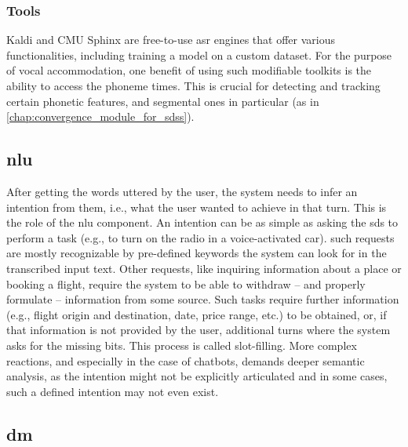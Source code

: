 \subsubsection{Tools}
\label{subsubsec:tools_asr}

Kaldi \citep{Povey2011kaldi} and CMU Sphinx \citep{Lamere2003sphinx} are free-to-use \ac{asr} engines that offer various functionalities, including training a model on a custom dataset.
For the purpose of vocal accommodation, one benefit of using such modifiable toolkits is the ability to access the phoneme times.
This is crucial for detecting and tracking certain phonetic features, and segmental ones in particular (as in \cref{chap:convergence_module_for_sdss}).

\subsection{\Acl{nlu}}
\label{subsec:natural_language_understanding}

After getting the words uttered by the user, the system needs to infer an intention from them, i.e., what the user wanted to achieve in that turn.
This is the role of the \acf{nlu} component.
An intention can be as simple as asking the \ac{sds} to perform a task (e.g., to turn on the radio in a voice-activated car).
such requests are mostly recognizable by pre-defined keywords the system can look for in the transcribed input text.
Other requests, like inquiring information about a place or booking a flight, require the system to be able to withdraw -- and properly formulate -- information from some source.
Such tasks require further information (e.g., flight origin and destination, date, price range, etc.) to be obtained, or, if that information is not provided by the user, additional turns where the system asks for the missing bits.
This process is called slot-filling.
More complex reactions, and especially in the case of chatbots, demands deeper semantic analysis, as the intention might not be explicitly articulated and in some cases, such a defined intention may not even exist.


\subsection{\Acl{dm}}
\label{subsec:dialogue_management}

